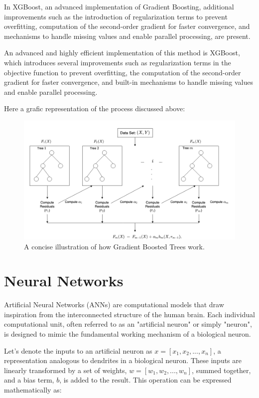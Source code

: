 In XGBoost, an advanced implementation of Gradient Boosting, additional improvements such as the introduction of regularization terms to prevent overfitting, computation of the second-order gradient for faster convergence, and mechanisms to handle missing values and enable parallel processing, are present. 


An advanced and highly efficient implementation of this method is XGBoost, which introduces several improvements such as regularization terms in the objective function to prevent overfitting, the computation of the second-order gradient for faster convergence, and built-in mechanisms to handle missing values and enable parallel processing.

Here a grafic representation of the process discussed above:


\begin{figure}[h!]
	\centering
	\includegraphics[width=0.9\linewidth]{Images/XGBoost}
	\caption{A concise illustration of how Gradient Boosted Trees work.}
	\label{fig:xgboost}
\end{figure}


\section{Neural Networks}
Artificial Neural Networks (ANNs) are computational models that draw inspiration from the interconnected structure of the human brain. Each individual computational unit, often referred to as an "artificial neuron" or simply "neuron", is designed to mimic the fundamental working mechanism of a biological neuron.

Let's denote the inputs to an artificial neuron as $ x = [x_1, x_2, ..., x_n] $, a representation analogous to dendrites in a biological neuron. These inputs are linearly transformed by a set of weights, $ w = [w_1, w_2, ..., w_n] $, summed together, and a bias term, $ b $, is added to the result. This operation can be expressed mathematically as:

